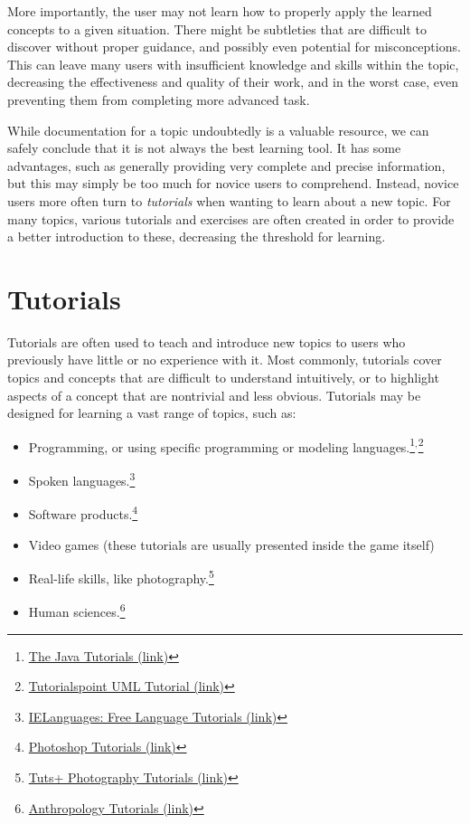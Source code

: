 \noindent
More importantly, the user may not learn how to properly apply the learned concepts to a given situation. There might be subtleties that are difficult to discover without proper guidance, and possibly even potential for misconceptions. This can leave many users with insufficient knowledge and skills within the topic, decreasing the effectiveness and quality of their work, and in the worst case, even preventing them from completing more advanced task.

\noindent
While documentation for a topic undoubtedly is a valuable resource, we can safely conclude that it is not always the best learning tool. It has some advantages, such as generally providing very complete and precise information, but this may simply be too much for novice users to comprehend. Instead, novice users more often turn to \emph{tutorials} when wanting to learn about a new topic. For many topics, various tutorials and exercises are often created in order to provide a better introduction to these, decreasing the threshold for learning.

\section{Tutorials}
\label{sec:tutorials}
Tutorials are often used to teach and introduce new topics to users who previously have little or no experience with it. Most commonly, tutorials cover topics and concepts that are difficult to understand intuitively, or to highlight aspects of a concept that are nontrivial and less obvious. Tutorials may be designed for learning a vast range of topics, such as:
\begin{itemize}
	\item Programming, or using specific programming or modeling languages.\footnote{\href{http://docs.oracle.com/javase/tutorial/}{The Java Tutorials  (link)}}$^{,}$\footnote{\href{http://www.tutorialspoint.com/uml/}{Tutorialspoint UML Tutorial (link)}}
	\item Spoken languages.\footnote{\href{http://ielanguages.com/}{IELanguages: Free Language Tutorials (link)}}
	\item Software products.\footnote{\href{http://www.photoshoptutorials.ws/category/photoshop-tutorials/}{Photoshop Tutorials (link)}}
	\item Video games (these tutorials are usually presented inside the game itself)
	\item Real-life skills, like photography.\footnote{\href{http://photography.tutsplus.com/}{Tuts+ Photography Tutorials (link)}}
	\item Human sciences.\footnote{\href{http://anthro.palomar.edu/tutorials/}{Anthropology Tutorials (link)}}
\end{itemize}

